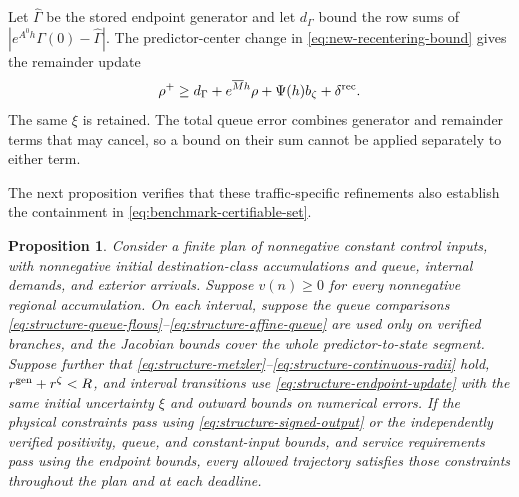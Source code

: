 \documentclass[preprint,12pt]{elsarticle}
\theoremstyle{definition}
\theoremstyle{plain}
\newtheorem{proposition}{Proposition}
\theoremstyle{definition}
\theoremstyle{plain}
\begin{document}
Let $\widehat\Gamma$ be the stored endpoint generator and let $d_\Gamma$
bound the row sums of $|e^{A^0h}\Gamma(0)-\widehat\Gamma|$.
The predictor-center change in \eqref{eq:new-recentering-bound} gives
the remainder update
\begin{equation}
 \rho^+\ge d_\Gamma+e^{\overline{M}h}\rho+\Psi(h)b_\zeta+\delta^{\rm rec}.
 \label{eq:structure-endpoint-update}
\end{equation}
The same $\xi$ is retained. The total queue error combines generator and
remainder terms that may cancel, so a bound on their sum cannot be applied
separately to either term.

The next proposition verifies that these traffic-specific refinements
also establish the containment in \eqref{eq:benchmark-certifiable-set}.

\begin{proposition}
\label{prop:structure-plan}
Consider a finite plan of nonnegative constant control inputs, with
nonnegative initial destination-class accumulations and queue, internal
demands, and exterior arrivals. Suppose $v(n)\ge0$ for every nonnegative
regional accumulation. On each interval, suppose the queue comparisons
\eqref{eq:structure-queue-flows}--\eqref{eq:structure-affine-queue} are
used only on verified branches, and the Jacobian bounds cover the whole
predictor-to-state segment. Suppose further that
\eqref{eq:structure-metzler}--\eqref{eq:structure-continuous-radii} hold,
$r^{\rm gen}+r^\zeta<R$, and interval transitions use
\eqref{eq:structure-endpoint-update} with the same initial uncertainty
$\xi$ and outward bounds on numerical errors. If the physical constraints
pass using \eqref{eq:structure-signed-output} or the independently
verified positivity, queue, and constant-input bounds, and service
requirements pass using the endpoint bounds, every allowed trajectory
satisfies those constraints throughout the plan and at each deadline.
\end{proposition}
\end{document}
